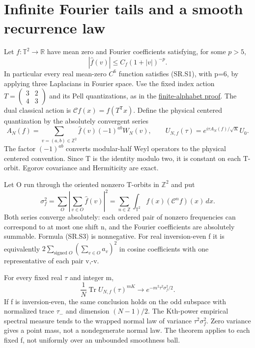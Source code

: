 \section{Infinite Fourier tails and a smooth recurrence law}\label{sec:smooth}
Let \(f:\mathbb T^2\to\mathbb R\) have mean zero and Fourier coefficients satisfying, for some \(p>5\), \[
 |\widehat f(v)|\leq C_f(1+|v|)^{-p}.                         \tag{SR.S1}
\] In particular every real mean-zero \(C^6\) function satisfies (SR.S1), with p=6, by applying three Laplacians in Fourier space. Use the fixed index action \(T=\left(\begin{smallmatrix}3&2\\4&3\end{smallmatrix}\right)\) and its Pell quantizations, as in the \hyperref[sec:finite_fourier]{finite-alphabet proof}. The dual classical action is \(\mathcal Cf(x)=f(T^{\mathsf T}x)\). Define the physical centered quantization by the absolutely convergent series \[
 A_N(f)=\sum_{v=(a,b)\in\mathbb Z^2}\widehat f(v)(-1)^{ab}W_N(v),
 \qquad U_{N,f}(\tau)=e^{i\tau A_N(f)/\sqrt K}U_0.              \tag{SR.S2}
\] The factor \((-1)^{ab}\) converts modular-half Weyl operators to the physical centered convention. Since T is the identity modulo two, it is constant on each T-orbit. Egorov covariance and Hermiticity are exact.

Let O run through the oriented nonzero T-orbits in \(\mathbb Z^2\) and put \[
 \sigma_f^2=\sum_O\left|\sum_{v\in O}\widehat f(v)\right|^2
          =\sum_{n\in\mathbb Z}\int_{\mathbb T^2}f(x)
                                      (\mathcal C^nf)(x)\,dx. \tag{SR.S3}
\] Both series converge absolutely: each ordered pair of nonzero frequencies can correspond to at most one shift n, and the Fourier coefficients are absolutely summable. Formula (SR.S3) is nonnegative. For real inversion-even f it is equivalently \(2\sum_{\text{signed }O}(\sum_{v\in O}a_v)^2\) in cosine coefficients with one representative of each pair v,-v.

\begin{theorem}\label{pass1:smooth-1} For every fixed real \(\tau\) and integer m, \[
 \boxed{\frac1N\operatorname{Tr}U_{N,f}(\tau)^{mK}
                  \longrightarrow e^{-m^2\tau^2\sigma_f^2/2}.} \tag{SR.S4}
\] If f is inversion-even, the same conclusion holds on the odd subspace with normalized trace \(\tau_-\) and dimension \((N-1)/2\). The Kth-power empirical spectral measure tends to the wrapped normal law of variance \(\tau^2\sigma_f^2\). Zero variance gives a point mass, not a nondegenerate normal law. The theorem applies to each fixed f, not uniformly over an unbounded smoothness ball.
\end{theorem}

